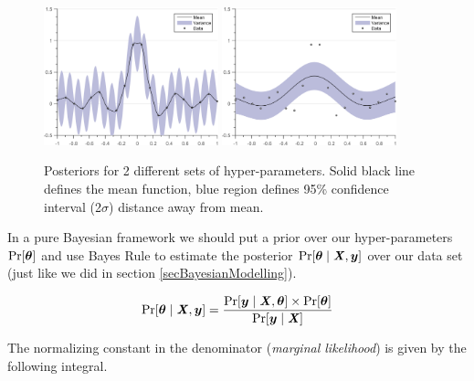   \begin{figure}[!ht]
  \centering
    \subfigure[{Posterior between SE prior with hyper-parameters $(\VEC{\theta} = [0.35, 0.05]; \sigma_{noise} = 0.01)$ and data. }]
  {
        \includegraphics[width=0.45\textwidth]
        {images/part1/posteriorSE1}
        \label{subFigPosterior1}
  }\quad
\subfigure[{Posterior between SE prior with hyper-parameters $(\VEC{\theta} = [0.35, 0.5]; \sigma_{noise} = 0.01)$ and data. }]
  {
        \includegraphics[width=0.45\textwidth]
        {images/part1/posteriorSE3}
        \label{subFigPosterior3}
  }\quad
       \caption{Posteriors for 2 different sets of hyper-parameters. Solid black line defines the mean function, blue region defines 95\% confidence interval (2$\sigma$) distance away from mean. }\label{figGPRMarginal}
\end{figure}

In a pure Bayesian framework we should put a prior over our hyper-parameters $\Pr[\boldsymbol{\theta}]$ and use Bayes Rule to estimate the posterior $\Pr[\boldsymbol{\theta} \mid \bm{\mathit{X}}, \boldsymbol{y}]$ over our data set (just like we did in section \ref{secBayesianModelling}). 

\begin{equation}
    \Pr[\boldsymbol{\theta} \mid \bm{\mathit{X}}, \boldsymbol{y}] = \frac{\Pr[\boldsymbol{y} \mid \bm{\mathit{X}}, \boldsymbol{\theta}] \times \Pr[\boldsymbol{\theta}]}{\Pr[\boldsymbol{y} \mid \bm{\mathit{X}}]}
\end{equation}

The normalizing constant in the denominator (\textit{marginal likelihood}) is given by the following integral.

